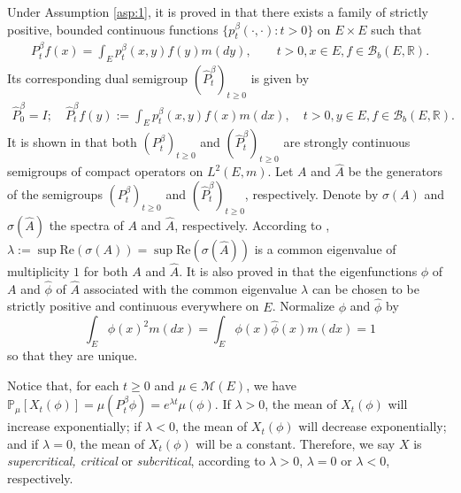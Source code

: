 \documentclass[12pt,a4paper]{amsart}
\numberwithin{equation}{section}
\theoremstyle{plain}
\theoremstyle{definition}
\begin{document}
\par
Under Assumption \ref{asp:1}, it is proved in \cite{RenSongZhang2015Limit,RenSongZhang2017Central} that there exists a family
of strictly positive, bounded continuous functions $\{ p^\beta_t(\cdot,\cdot): t
> 0 \}$ on $E \times E$ such that
\begin{align}
	P^\beta_t f(x)
	= \int_E p_t^\beta (x,y) f(y) m(dy),
	\quad \quad t>0, x \in E,f \in \mathcal B_b(E,\mathbb R).
\end{align}
Its corresponding dual semigroup $(\widehat P^{\beta}_t)_{t \geq 0}$ is given by
\begin{align}
	\widehat P^{\beta}_0 = I;
	\quad \widehat P^{\beta}_t f(y)
	:= \int_E p^\beta_t (x,y) f(x) m(dx),
	\quad t>0, y\in E, f\in \mathcal B_b(E,\mathbb R).
\end{align}
It is shown in \cite{RenSongZhang2015Limit, RenSongZhang2017Central} that both $(P^\beta_t)_{t \geq 0}$ and $(\widehat P_t^{\beta})_{t\geq 0}$ are strongly continuous semigroups of compact operators on $L^2(E,m)$. 
Let $A$ and $\widehat
A$ be the generators of the semigroups $(P^\beta_t)_{t \geq 0}$ and $(\widehat
P^\beta_t)_{t \geq 0}$, respectively. 
Denote by $\sigma(A)$ and $\sigma(\widehat
A)$ the spectra of $A$ and $\widehat A$, respectively. 
According to \cite[Theorem V.6.6]{Schaefer1974Banach}, $\lambda := \sup \text{Re}(\sigma(A))
= \sup \text{Re}(\sigma(\widehat A))$ is a common eigenvalue of multiplicity $1$ for both $A$ and $\widehat A$. 
It is also proved in \cite{RenSongZhang2015Limit,RenSongZhang2017Central} that the eigenfunctions $\phi$ of $A$ and $\widehat\phi$ of $\widehat A$ associated with the common eigenvalue $\lambda$ can be chosen to be strictly positive and continuous everywhere on $E$. 
Normalize $\phi$ and $\widehat\phi$ by
\[	
	\int_E \phi(x)^2 m(dx) = \int_E \phi(x) \widehat \phi(x) m(dx) = 1
\]
so that they are unique.
\par
Notice that, for each $t \geq 0$ and $\mu \in \mathcal M(E)$, we have $ \mathbb
P_\mu[X_t(\phi)] = \mu(P^\beta_t \phi) = e^{\lambda t} \mu(\phi). $ 
If $\lambda
> 0$, the mean of $X_t(\phi)$ will increase exponentially; 
if $\lambda < 0$, the mean of $X_t(\phi)$ will decrease exponentially; 
and if $\lambda = 0$, the mean of $X_t(\phi)$ will be a constant. 
Therefore, we say $X$ is \emph{supercritical, critical} or \emph{subcritical}, according to $\lambda > 0$, $\lambda = 0$ or
$\lambda < 0$, respectively.
\par
\end{document}

